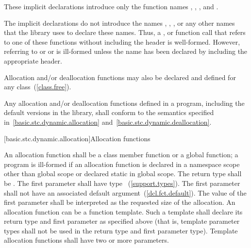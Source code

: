 These implicit declarations introduce only the function names
 ,  ,
 , and 
. \begin{note} The implicit declarations do not introduce
the names ,
,
,
or any other names that the library uses to
declare these names. Thus, a ,
 or function call that refers to one of
these functions without including the header  is
well-formed. However, referring to 
or 
or 
is ill-formed unless the name has been declared
by including the appropriate header. \end{note} Allocation and/or
deallocation functions may also be declared and defined for any
class~(\ref{class.free}).

\pnum
Any allocation and/or deallocation functions defined in a \Cpp program,
including the default versions in the library, shall conform to the
semantics specified in~\ref{basic.stc.dynamic.allocation}
and~\ref{basic.stc.dynamic.deallocation}.

[basic.stc.dynamic.allocation]{Allocation functions}

\pnum
{}%
An allocation function shall be a class member function or a global
function; a program is ill-formed if an allocation function is declared
in a namespace scope other than global scope or declared static in
global scope. The return type shall be . The first
parameter shall have type ~(\ref{support.types}). The
first parameter shall not have an associated default
argument~(\ref{dcl.fct.default}). The value of the first parameter shall
be interpreted as the requested size of the allocation. An allocation
function can be a function template. Such a template shall declare its
return type and first parameter as specified above (that is, template
parameter types shall not be used in the return type and first parameter
type). Template allocation functions shall have two or more parameters.

